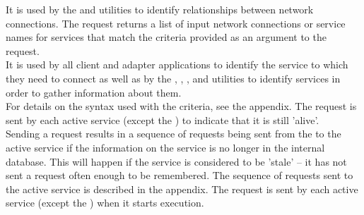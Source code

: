 It is used by the  and
 utilities to identify relationships
between \yarp{} network connections.
The  request returns a list of
input \yarp{} network connections or service names for services that match the criteria
provided as an argument to the request.\\

It is used by all client and adapter applications to identify the service to which they
need to connect as well as by the ,
, ,
 and 
utilities to identify services in order to gather information about them.\\

For details on the syntax used with the criteria, see the 
 appendix.
The  request is sent by each
active service (except the ) to indicate
that it is still 'alive'.\\

Sending a  request results in a
sequence of requests being sent from the 
to the active service if the information on the service is no longer in the internal
database.
This will happen if the service is considered to be 'stale' -- it has not sent a
 request often enough to be
remembered.
The sequence of requests sent to the active service is described in the 
 appendix.
The  request is sent by each
active service (except the ) when it
starts execution.\\

